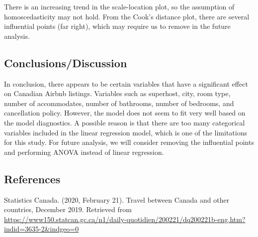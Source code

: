 \documentclass[
]{article}
\begin{document}
There is an increasing trend in the scale-location plot, so the
assumption of homoscedasticity may not hold. From the Cook's distance
plot, there are several influential points (far right), which may
require us to remove in the future analysis.

\hypertarget{conclusionsdiscussion}{%
\subsection{Conclusions/Discussion}\label{conclusionsdiscussion}}

In conclusion, there appears to be certain variables that have a
significant effect on Canadian Airbnb listings. Variables such as
superhost, city, room type, number of accommodates, number of bathrooms,
number of bedrooms, and cancellation policy. However, the model does not
seem to fit very well based on the model diagnostics. A possible reason
is that there are too many categorical variables included in the linear
regression model, which is one of the limitations for this study. For
future analysis, we will consider removing the influential points and
performing ANOVA instead of linear regression.

\hypertarget{references}{%
\subsection{References}\label{references}}

Statistics Canada. (2020, February 21). Travel between Canada and other
countries, December 2019. Retrieved from
\url{https://www150.statcan.gc.ca/n1/daily-quotidien/200221/dq200221b-eng.htm?indid=3635-2\&indgeo=0}
\end{document}

